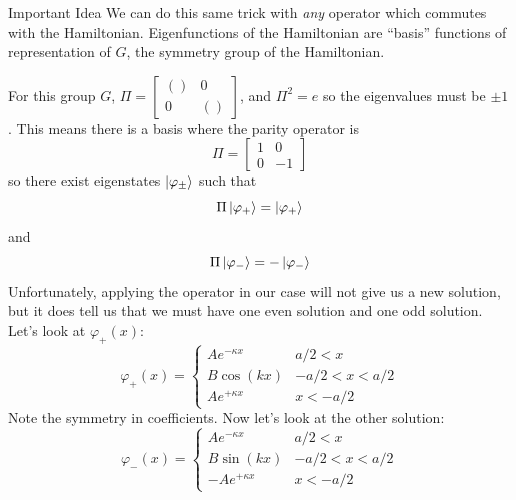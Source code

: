 \documentclass[a4paper,twoside,master.tex]{subfiles}
\begin{document}
\begin{note}{Important Idea}
    We can do this same trick with \textit{any} operator which commutes with the Hamiltonian. Eigenfunctions of the Hamiltonian are ``basis'' functions of representation of $ G $, the symmetry group of the Hamiltonian.
\end{note}

For this group $ G $, $ \Pi = 
\begin{bmatrix}
    () & 0\\
    0 & ()
\end{bmatrix}
$, and $ \Pi^2 = e $ so the eigenvalues must be $ \pm 1 $. This means there is a basis where the parity operator is
\begin{equation}
    \Pi = 
    \begin{bmatrix}
        1 & 0\\
        0 & -1
    \end{bmatrix}
\end{equation}
so there exist eigenstates $ \ket{\varphi_\pm} $ such that
\begin{equation}
    \Pi \ket{\varphi_+} = \ket{\varphi_+}
\end{equation}
and
\begin{equation}
    \Pi \ket{\varphi_-} = - \ket{\varphi_-}
\end{equation}
Unfortunately, applying the operator in our case will not give us a new solution, but it does tell us that we must have one even solution and one odd solution. Let's look at $ \varphi_+(x) $:
\begin{equation}
    \varphi_+(x) =
    \begin{cases}
        A e^{-\kappa x} & a/2 < x\\
        B \cos(kx) & -a/2 < x < a/2\\
        Ae^{+ \kappa x} & x < -a/2
    \end{cases}
\end{equation}
Note the symmetry in coefficients. Now let's look at the other solution:
\begin{equation}
    \varphi_-(x) =
    \begin{cases} 
        A e^{-\kappa x} & a/2 < x\\
        B \sin(kx) & -a/2 < x < a/2\\
        -A e^{+\kappa x} & x < -a/2
    \end{cases}
\end{equation}
\end{document}
